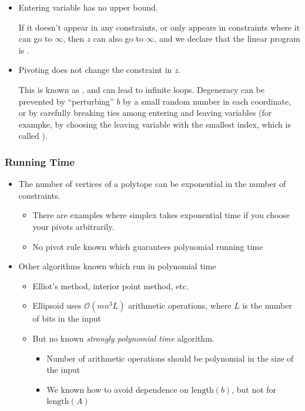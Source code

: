 \begin{itemize}
    \item Entering variable has no upper bound.
    
    If it doesn't appear in any constraints, or only appears in constraints where it can go to $\infty$, then $z$ can also go to $\infty$, and we declare that the linear program is .

    \item Pivoting does not change the constraint in $z$. 
    
    This is known as , and can lead to infinite loops. Degeneracy can be prevented by ``perturbing'' $b$ by a small random number in each coordinate, or by carefully breaking ties among entering and leaving variables (for exampke, by choosing the leaving variable with the smallest index, which is called ).
\end{itemize}


\subsubsection{Running Time}

\begin{itemize}
    \item The number of vertices of a polytope can be exponential in the number of constraints.

    \begin{itemize}
        \item There are examples where simplex takes exponential time if you choose your pivots arbitrarily.
        \item No pivot rule known which guarantees polynomial running time
    \end{itemize}

    \item Other algorithms known which run in polynomial time
    \begin{itemize}
        \item Elliot's method, interior point method, etc.
        \item Ellipsoid uses $\mathcal{O}(mn^3L)$ arithmetic operations, where $L$ is the number of bits in the input
        \item But no known \textit{strongly polynomial time} algorithm. 
        \begin{itemize}
            \item Number of arithmetic operations should be polynomial in the size of the input
            \item We known how to avoid dependence on $\text{length}(b)$, but not for $\text{length}(A)$
        \end{itemize}
    \end{itemize}
\end{itemize}